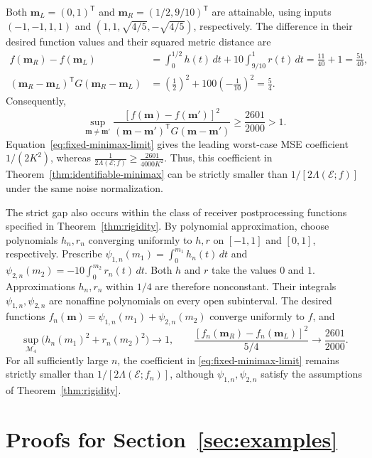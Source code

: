 \documentclass[journal,12pt,onecolumn,draftclsnofoot]{IEEEtran}
\newcommand{\enc}{\mathscr{E}}\newcommand{\dec}{\mathscr{D}}\newcommand{\R}{\mathbb R}\newcommand{\C}{\mathbb C}
\newcommand{\T}{\mathsf T}\newcommand{\suc}{\succeq}
\begin{document}
Both $\boldsymbol m_L=(0,1)^\T$ and $\boldsymbol m_R=(1/2,9/10)^\T$ are attainable, using inputs $(-1,-1,1,1)$ and $(1,1,\sqrt{4/5},-\sqrt{4/5})$, respectively. The difference in their desired function values and their squared metric distance are
$$
 \begin{aligned}
 f(\boldsymbol m_R)-f(\boldsymbol m_L)
 &=\int_0^{1/2}h(t)\,dt+10\int_{9/10}^1r(t)\,dt
 =\frac{11}{40}+1=\frac{51}{40},\\
 (\boldsymbol m_R-\boldsymbol m_L)^\T G
 (\boldsymbol m_R-\boldsymbol m_L)&=\left(\frac12\right)^2
 +100\left(-\frac1{10}\right)^2=\frac54.
 \end{aligned}
$$
Consequently,
$$
 \sup_{\boldsymbol m\ne\boldsymbol m'}
 \frac{[f(\boldsymbol m)-f(\boldsymbol m')]^2}
 {(\boldsymbol m-\boldsymbol m')^\T G(\boldsymbol m-\boldsymbol m')}
 \ge\frac{2601}{2000}>1.
$$
Equation~\eqref{eq:fixed-minimax-limit} gives the leading worst-case MSE coefficient $1/(2K^2)$, whereas
$\frac{1}{2\Lambda(\enc;f)}\ge\frac{2601}{4000K^2}.$
Thus, this coefficient in Theorem~\ref{thm:identifiable-minimax} can be strictly smaller than $1/[2\Lambda(\enc;f)]$ under the same noise normalization.

The strict gap also occurs within the class of receiver postprocessing functions specified in Theorem~\ref{thm:rigidity}. By polynomial approximation, choose polynomials $h_n,r_n$ converging uniformly to $h,r$ on $[-1,1]$ and $[0,1]$, respectively. Prescribe $\psi_{1,n}(m_1)=\int_0^{m_1} h_n(t)\,dt$ and $\psi_{2,n}(m_2)=-10\int_0^{m_2} r_n(t)\,dt$. Both $h$ and $r$ take the values $0$ and $1$. Approximations $h_n,r_n$ within $1/4$ are therefore nonconstant. Their integrals $\psi_{1,n},\psi_{2,n}$ are nonaffine polynomials on every open subinterval. The desired functions $f_n(\boldsymbol m)=\psi_{1,n}(m_1)+\psi_{2,n}(m_2)$ converge uniformly to $f$, and
$$
 \sup_{\mathcal M_4}\bigl(h_n(m_1)^2+r_n(m_2)^2\bigr)\longrightarrow1,
 \qquad
 \frac{[f_n(\boldsymbol m_R)-f_n(\boldsymbol m_L)]^2}{5/4}
 \longrightarrow\frac{2601}{2000}.
$$
For all sufficiently large $n$, the coefficient in
\eqref{eq:fixed-minimax-limit} remains strictly smaller than
$1/[2\Lambda(\enc;f_n)]$, although $\psi_{1,n},\psi_{2,n}$
satisfy the assumptions of Theorem~\ref{thm:rigidity}.






\section{Proofs for Section~\ref{sec:examples}}\label{app:example-proofs}
\end{document}
